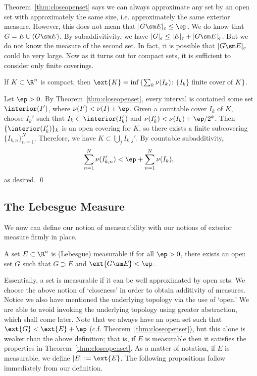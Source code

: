 Theorem~\ref{thm:closeopenset} says we can always approximate any set by an open set with approximately the same size, i.e. approximately the same exterior measure. However, this does not mean that $|G \sm E|_e \leq \ep$. We do know that $G = E \cup (G\sm E)$. By subaddivitivity, we have $|G|_e \leq |E|_e + |G \sm E|_e$. But we do not know the measure of the second set. In fact, it is possible that $|G \sm E|_e$ could be very large. Now as it turns out for compact sets, it is sufficient to consider only finite coverings.


\begin{prop} \label{prop:fincovcomset}
If $K \subset \R^n$ is compact, then $\ext{K}= \inf \left\{ \sum_k \nu(I_k) \colon \{I_k\} \text{ finite cover of }K \right\}$. 
\end{prop}

\pf Let $\ep>0$. By Theorem~\ref{thm:closeopenset}, every interval is contained some set $\interior(I')$, where $\nu(I')< \nu(I) + \ep$. Given a countable cover $I_k$ of $K$, choose $I_k'$ such that $I_k \subset \interior(I_k')$ and $\nu(I_k') < \nu(I_k) + \ep/2^k$. Then $\{\interior(I_k')\}_k$ is an open covering for $K$, so there exists a finite subcovering $\{I_{k,n}\}_{n=1}^N$. Therefore, we have $K \subset \bigcup_j I_{k,j}'$. By countable subadditivity,
	\[
	\sum_{n=1}^N \nu(I_{k,n}') < \ep + \sum_{n=1}^N \nu(I_k),
	\]
as desired. \qed \\



\subsection{The Lebesgue Measure}

We now can define our notion of measurability with our notions of exterior measure firmly in place. 


\begin{dfn}[Measurable]
A set $E \subset \R^n$ is (Lebesgue) measurable if for all $\ep>0$, there exists an open set $G$ such that $G \supset E$ and $\ext{G \sm E} < \ep$.
\end{dfn}


Essentially, a set is measurable if it can be well approximated by open sets. We choose the above notion of `closeness' in order to obtain additivity of measures. Notice we also have mentioned the underlying topology via the use of `open.' We are able to avoid invoking the underlying topology using greater abstraction, which shall come later. Note that we always have an open set such that $\ext{G} < \ext{E}+\ep$ (c.f. Theorem~\ref{thm:closeopenset}), but this alone is weaker than the above definition; that is, if $E$ is measurable then it satisfies the properties in Theorem~\ref{thm:closeopenset}. As a matter of notation, if $E$ is measurable, we define $|E|:= \ext{E}$. The following propositions follow immediately from our definition.


